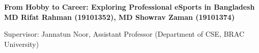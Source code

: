 \documentclass[a0,landscape]{a0poster}
\begin{document}

\begin{minipage}[b]{0.8\linewidth}
\veryHuge \color{RoyalBlue} \textbf{From Hobby to Career: Exploring Professional eSports in Bangladesh} \color{Black}\\ %
\vspace{1cm}
\huge \textbf{MD Rifat Rahman (19101352), MD Showrav Zaman (19101374)} \par
\large Supervisor: Jannatun Noor, Assistant Professor (Department of CSE, BRAC University)
\end{minipage}

\vspace{1cm}

\end{document}
